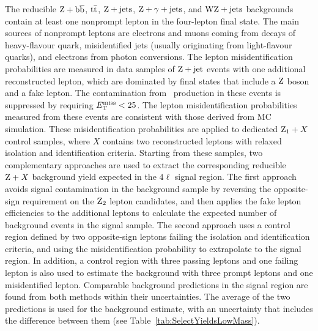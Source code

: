 \documentclass[12pt,twoside,a4paper,cmspaper,final,collab]{cms-tdr}
\begin{document}
The reducible $\mathrm{Z}+\mathrm{b}\overline{\mathrm{b}}$, $\mathrm{t}\overline{\mathrm{t}}$, $\mathrm{Z}+\text{jets}$,  $\mathrm{Z}+\gamma+\text{jets}$, and  $\mathrm{W}\mathrm{Z}+\text{jets}$ backgrounds
contain at least one nonprompt lepton in the four-lepton final state.
The main sources of nonprompt leptons are electrons and muons coming from
decays of heavy-flavour quark, misidentified jets (usually originating from light-flavour quarks),
and electrons from photon conversions.
The lepton misidentification probabilities are measured in data samples of $\mathrm{Z}+\text{jet}$ events
with one additional reconstructed lepton, which are dominated by final states that
include a $\mathrm{Z}$ boson and a fake lepton.
The contamination from \PW\cPZ\ production in these events is suppressed by
requiring $E_{\mathrm{T}}^{\text{miss}} <25$\GeV.
The lepton misidentification probabilities measured from these events are consistent with those
derived from MC simulation.
These misidentification probabilities are applied to dedicated
$\mathrm{Z}_1+X$ control samples, where $X$ contains two reconstructed leptons with relaxed isolation and identification
criteria.  Starting from these samples, two complementary approaches
are used  to extract  the corresponding reducible $\mathrm{Z}+X$ background
yield expected in the $4\ell$ signal region.
The first approach
avoids signal contamination in the background sample by reversing the
opposite-sign requirement on the $\mathrm{Z}_2$ lepton candidates, and then applies
the fake lepton efficiencies to the additional leptons to calculate the
expected number of background events in the signal sample.
The second approach  uses a control region defined by two opposite-sign leptons failing the isolation
and identification criteria, and using the misidentification probability to extrapolate to the signal region.
In addition, a control region with three passing leptons and one failing lepton is also used to
estimate the background with three prompt leptons and one misidentified lepton.
Comparable background predictions in the signal region are found  from
both methods within their uncertainties. The average of the two predictions is used
for the background estimate, with an uncertainty that includes the difference
between them (see Table~\ref{tab:SelectYieldsLowMass}).
\end{document}
